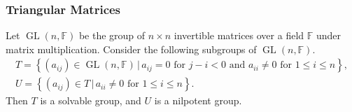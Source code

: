 \subsubsection{Triangular Matrices}
\begin{example} \label{exp-nil-sol-matrices}
	Let $\operatorname{GL}(n, \mathbb{F})$ be the group of $n \times n$ invertible matrices over a field $\mathbb{F}$ under matrix multiplication. Consider the following subgroups of $\operatorname{GL}(n, \mathbb{F})$.
	\begin{gather*}
		T = \left\{ (a_{ij}) \in \operatorname{GL}(n, \mathbb{F})\,|\, a_{ij} = 0\text{ for }j-i<0\text{ and }a_{ii}\neq 0\text{ for }1\leq i\leq n  \right\},
		\\
		U = \left\{(a_{ij}) \in T\,|\, a_{ii}\neq 0\text{ for }1\leq i\leq n\right\}.
	\end{gather*}
	Then $T$ is a solvable group, and $U$ is a nilpotent group.
\end{example}
